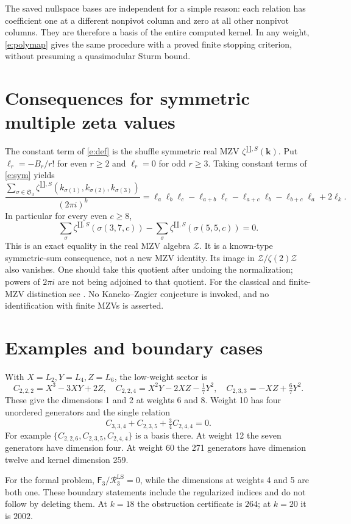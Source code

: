\documentclass[12pt]{amsart}
\theoremstyle{definition}
\theoremstyle{remark}
\numberwithin{equation}{section}
\newcommand{\sh}{\mathbin{\amalg}}
\newcommand{\RR}{\mathcal R^{\mathrm{LS}}}
\newcommand{\FF}{\mathsf F}
\numberwithin{equation}{section}
\begin{document}
The saved nullspace bases are independent for a simple reason: each relation
has coefficient one at a different nonpivot column and zero at all other
nonpivot columns. They are therefore a basis of the entire computed kernel.
In any weight, \eqref{e:polymap} gives the same procedure with a proved
finite stopping criterion, without presuming a quasimodular Sturm bound.

\section{Consequences for symmetric multiple zeta values}
The constant term of \eqref{e:def} is the shuffle symmetric real MZV
$\zeta^{\sh,S}(\boldsymbol k)$. Put
$\ell_r=-B_r/r!$ for even $r\ge2$ and $\ell_r=0$ for odd $r\ge3$.
Taking constant terms of \eqref{e:sym} yields
\begin{equation}\label{e:constant}
 \frac{\sum_{\sigma\in\mathfrak S_3}
        \zeta^{\sh,S}(k_{\sigma(1)},k_{\sigma(2)},k_{\sigma(3)})}{(2\pi i)^k}
 =\ell_a\ell_b\ell_c-\ell_{a+b}\ell_c-\ell_{a+c}\ell_b-\ell_{b+c}\ell_a+2\ell_k.
\end{equation}
In particular for every even $c\ge8$,
\[
 \sum_{\sigma}\zeta^{\sh,S}(\sigma(3,7,c))
 -\sum_{\sigma}\zeta^{\sh,S}(\sigma(5,5,c))=0.
\]
This is an exact equality in the real MZV algebra $\mathcal Z$.
It is a known-type symmetric-sum consequence, not a new MZV identity.
Its image in $\mathcal Z/\zeta(2)\mathcal Z$ also vanishes. One should take
this quotient after undoing the normalization; powers of $2\pi i$ are not
being adjoined to that quotient. For the classical and finite-MZV distinction see \cite{kaneko}.
No Kaneko--Zagier conjecture is invoked,
and no identification with finite MZVs is asserted.

\section{Examples and boundary cases}
With $X=L_2,Y=L_4,Z=L_6$, the low-weight sector is
\[
 C_{2,2,2}=X^3-3XY+2Z,\quad
 C_{2,2,4}=X^2Y-2XZ-\tfrac17Y^2,\quad
 C_{2,3,3}=-XZ+\tfrac67Y^2.
\]
These give the dimensions 1 and 2 at weights 6 and 8. Weight 10 has
four unordered generators and the single relation
\[
 C_{3,3,4}+C_{2,3,5}+\tfrac34 C_{2,4,4}=0.
\]
For example $\{C_{2,2,6},C_{2,3,5},C_{2,4,4}\}$ is a basis there.
At weight 12 the seven generators have dimension four. At weight 60 the
271 generators have dimension twelve and kernel dimension 259.

For the formal problem, $\FF_3/\RR_3=0$, while the dimensions at weights
4 and 5 are both one. These boundary statements include the regularized
indices and do not follow by deleting them. At $k=18$ the obstruction
certificate is $264$; at $k=20$ it is $2002$.
\end{document}
